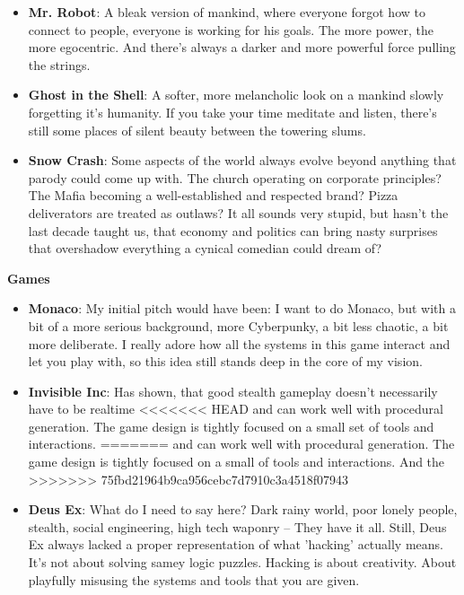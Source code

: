 \documentclass[11pt,a4paper]{article}
\begin{document}
\begin{itemize}
    \item \textbf{Mr. Robot}: A bleak version of mankind, where everyone forgot how to connect to people,
            everyone is working for his goals. The more power, the more egocentric. And there's
            always a darker and more powerful force pulling the strings.
    \item \textbf{Ghost in the Shell}: A softer, more melancholic look on a mankind slowly forgetting it's
            humanity. If you take your time meditate and listen, there's still some places of silent
            beauty between the towering slums.
    \item \textbf{Snow Crash}: Some aspects of the world always evolve beyond anything that parody could come
            up with. The church operating on corporate principles? The Mafia becoming a
            well-established and respected brand? Pizza deliverators are treated as outlaws?
            It all sounds very stupid, but hasn't the last decade taught us, that economy and politics
            can bring nasty surprises that overshadow everything a cynical comedian could dream of?
\end{itemize}

\textbf{Games}

\begin{itemize}
    \item \textbf{Monaco}: My initial pitch would have been: I want to do Monaco, but with a bit of a more serious
                background, more Cyberpunky, a bit less chaotic, a bit more deliberate. I really adore how all
                the systems in this game interact and let you play with, so this idea still stands deep in the
                core of my vision.
    \item \textbf{Invisible Inc}: Has shown, that good stealth gameplay doesn't necessarily have to be realtime
<<<<<<< HEAD
                and can work well with procedural generation. The game design is tightly focused on a small set
                of tools and interactions.
=======
                and can work well with procedural generation. The game design is tightly focused on a small
                of tools and interactions. And the
>>>>>>> 75fbd21964b9ca956cebc7d7910c3a4518f07943
    \item \textbf{Deus Ex}: What do I need to say here? Dark rainy world, poor lonely people, stealth,
                social engineering, high tech waponry -- They have it all. Still, Deus Ex always lacked a proper representation of
                what 'hacking' actually means. It's not about solving samey logic puzzles. Hacking is about creativity.
                About playfully misusing the systems and tools that you are given.
\end{itemize}
\end{document}
